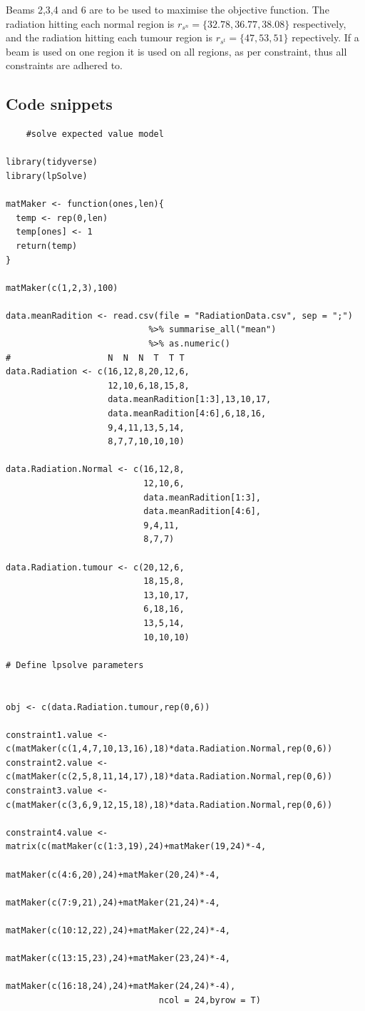\documentclass[a4paper,11pt]{article}
\begin{document}
Beams 2,3,4 and 6 are to be used to maximise the objective function. The radiation hitting each normal region is $r_{s^n}=\{32.78, 36.77, 38.08\}$ respectively, and the radiation hitting each tumour region is $r_{s^t}=\{47, 53, 51\}$ repectively. If a beam is used on one region it is used on all regions, as per constraint, thus all constraints are adhered to. 

\subsection{Code snippets}
\label{q2a:Code}
\begin{verbatim}
	#solve expected value model

library(tidyverse)
library(lpSolve)

matMaker <- function(ones,len){
  temp <- rep(0,len)
  temp[ones] <- 1
  return(temp)
}

matMaker(c(1,2,3),100)

data.meanRadition <- read.csv(file = "RadiationData.csv", sep = ";") 
							%>% summarise_all("mean")
 							%>% as.numeric()
#                   N  N  N  T  T T
data.Radiation <- c(16,12,8,20,12,6,
                    12,10,6,18,15,8,
                    data.meanRadition[1:3],13,10,17,
                    data.meanRadition[4:6],6,18,16,
                    9,4,11,13,5,14,
                    8,7,7,10,10,10)

data.Radiation.Normal <- c(16,12,8,
                           12,10,6,
                           data.meanRadition[1:3],
                           data.meanRadition[4:6],
                           9,4,11,
                           8,7,7)

data.Radiation.tumour <- c(20,12,6,
                           18,15,8,
                           13,10,17,
                           6,18,16,
                           13,5,14,
                           10,10,10)

# Define lpsolve parameters


obj <- c(data.Radiation.tumour,rep(0,6))

constraint1.value <- c(matMaker(c(1,4,7,10,13,16),18)*data.Radiation.Normal,rep(0,6))
constraint2.value <- c(matMaker(c(2,5,8,11,14,17),18)*data.Radiation.Normal,rep(0,6))
constraint3.value <- c(matMaker(c(3,6,9,12,15,18),18)*data.Radiation.Normal,rep(0,6))

constraint4.value <- matrix(c(matMaker(c(1:3,19),24)+matMaker(19,24)*-4,
                              matMaker(c(4:6,20),24)+matMaker(20,24)*-4,
                              matMaker(c(7:9,21),24)+matMaker(21,24)*-4,
                              matMaker(c(10:12,22),24)+matMaker(22,24)*-4,
                              matMaker(c(13:15,23),24)+matMaker(23,24)*-4,
                              matMaker(c(16:18,24),24)+matMaker(24,24)*-4),
                              ncol = 24,byrow = T)


\end{verbatim}
\end{document}
